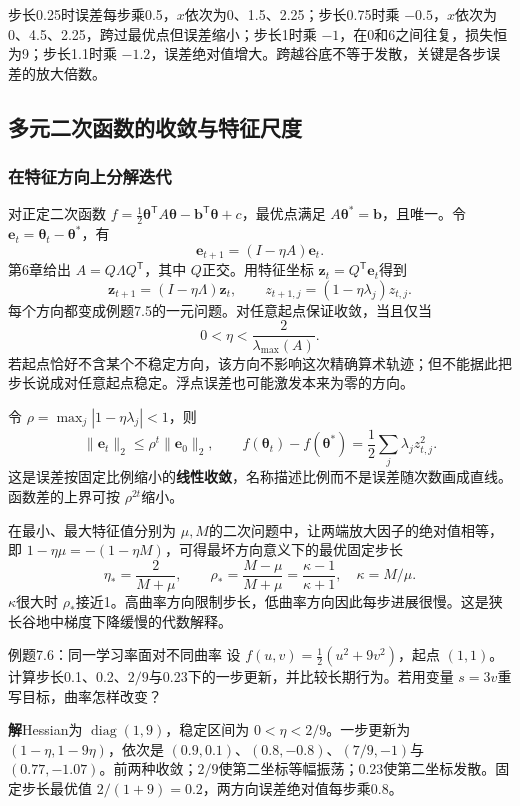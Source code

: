 \documentclass[UTF8,fontset=none,zihao=-4,a4paper]{ctexart}
\newcommand{\term}[1]{\textbf{#1}}
\newcommand{\sol}{\par\noindent\textbf{解}\quad}
\numberwithin{equation}{section}
\numberwithin{figure}{section}
\begin{document}
步长0.25时误差每步乘0.5，$x$依次为0、1.5、2.25；步长0.75时乘 $-0.5$，$x$依次为0、4.5、2.25，跨过最优点但误差缩小；步长1时乘 $-1$，在0和6之间往复，损失恒为9；步长1.1时乘 $-1.2$，误差绝对值增大。跨越谷底不等于发散，关键是各步误差的放大倍数。

\subsection{多元二次函数的收敛与特征尺度}
\subsubsection{在特征方向上分解迭代}
对正定二次函数 $f=\frac12\symbf\theta^{\mathsf T}A\symbf\theta-\symbf b^{\mathsf T}\symbf\theta+c$，最优点满足 $A\symbf\theta^*=\symbf b$，且唯一。令 $\symbf e_t=\symbf\theta_t-\symbf\theta^*$，有
\[
 \symbf e_{t+1}=(I-\eta A)\symbf e_t.
\]
第6章给出 $A=Q\Lambda Q^{\mathsf T}$，其中 $Q$正交。用特征坐标 $\symbf z_t=Q^{\mathsf T}\symbf e_t$得到
\[
 \symbf z_{t+1}=(I-\eta\Lambda)\symbf z_t,\qquad
 z_{t+1,j}=(1-\eta\lambda_j)z_{t,j}.
\]
每个方向都变成例题7.5的一元问题。对任意起点保证收敛，当且仅当
\begin{equation}\label{eq:quadratic-step}
 0<\eta<\frac2{\lambda_{\max}(A)}.
\end{equation}
若起点恰好不含某个不稳定方向，该方向不影响这次精确算术轨迹；但不能据此把步长说成对任意起点稳定。浮点误差也可能激发本来为零的方向。

令 $\rho=\max_j|1-\eta\lambda_j|<1$，则
\[
 \|\symbf e_t\|_2\le\rho^t\|\symbf e_0\|_2,\qquad
 f(\symbf\theta_t)-f(\symbf\theta^*)=\frac12\sum_j\lambda_jz_{t,j}^2.
\]
这是误差按固定比例缩小的\term{线性收敛}，名称描述比例而不是误差随次数画成直线。函数差的上界可按 $\rho^{2t}$缩小。

在最小、最大特征值分别为 $\mu,M$的二次问题中，让两端放大因子的绝对值相等，即 $1-\eta\mu=-(1-\eta M)$，可得最坏方向意义下的最优固定步长
\[
 \eta_* =\frac2{M+\mu},\qquad
 \rho_* =\frac{M-\mu}{M+\mu}=\frac{\kappa-1}{\kappa+1},\quad \kappa=M/\mu.
\]
$\kappa$很大时 $\rho_*$接近1。高曲率方向限制步长，低曲率方向因此每步进展很慢。这是狭长谷地中梯度下降缓慢的代数解释。

\begin{infobox}{例题7.6：同一学习率面对不同曲率}
设 $f(u,v)=\frac12(u^2+9v^2)$，起点 $(1,1)$。计算步长0.1、0.2、$2/9$与0.23下的一步更新，并比较长期行为。若用变量 $s=3v$重写目标，曲率怎样改变？
\end{infobox}
\sol Hessian为 $\operatorname{diag}(1,9)$，稳定区间为 $0<\eta<2/9$。一步更新为 $(1-\eta,1-9\eta)$，依次是 $(0.9,0.1)$、$(0.8,-0.8)$、$(7/9,-1)$与 $(0.77,-1.07)$。前两种收敛；$2/9$使第二坐标等幅振荡；0.23使第二坐标发散。固定步长最优值 $2/(1+9)=0.2$，两方向误差绝对值每步乘0.8。
\end{document}

